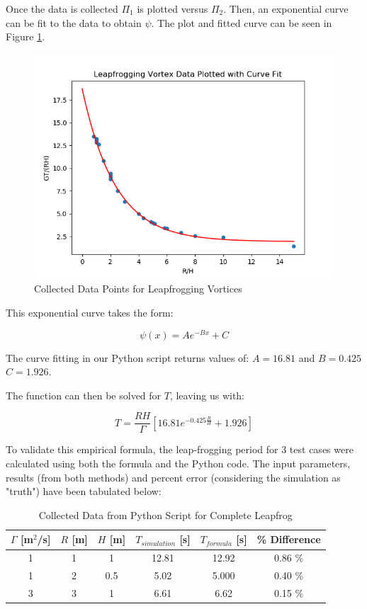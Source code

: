 \documentclass[10pt]{article}
\begin{document}
Once the data is collected $\Pi_1$ is plotted versus $\Pi_2$. Then, an exponential curve can be fit to the data to obtain $\psi$. The plot and fitted curve can be seen in Figure \ref{fig:fit}.

\begin{figure}[H]
    \centering
    \includegraphics[width=0.7\linewidth]{figures/datafit.png}
    \caption{Collected Data Points for Leapfrogging Vortices}
    \label{fig:fit}
\end{figure}

This exponential curve takes the form:

\[\psi(x) = Ae^{-Bx} + C\]

The curve fitting in our Python script returns values of: $A=16.81$ and $B=0.425$ $C=1.926$.

The function can then be solved for $T$, leaving us with:

\[\boxed{T=\frac{RH}{\Gamma}\left[16.81e^{-0.425\frac{R}{H}}+1.926\right]}\]


To validate this empirical formula, the leap-frogging period for 3 test cases were calculated using both the formula and the Python code. The input parameters, results (from both methods) and percent error (considering the simulation as "truth") have been tabulated below:


\begin{table}[H]
    \centering
    \begin{tabular}{c c c c c c}
    $\Gamma$ [m$^2$/s]& $R$ [m]& $H$ [m]& $T_{simulation}$ [s] & $T_{formula}$ [s] & \% Difference \\ \hline
    1 & 1 & 1 & 12.81 & 12.92 & 0.86 \%\\
    1 & 2 & 0.5 & 5.02 & 5.000 & 0.40 \%\\
    3 & 3 & 1 & 6.61 & 6.62 & 0.15 \% \\
    \end{tabular}
    \caption{Collected Data from Python Script for Complete Leapfrog}
    \label{tab:error_analysis_1}
\end{table}
\end{document}
